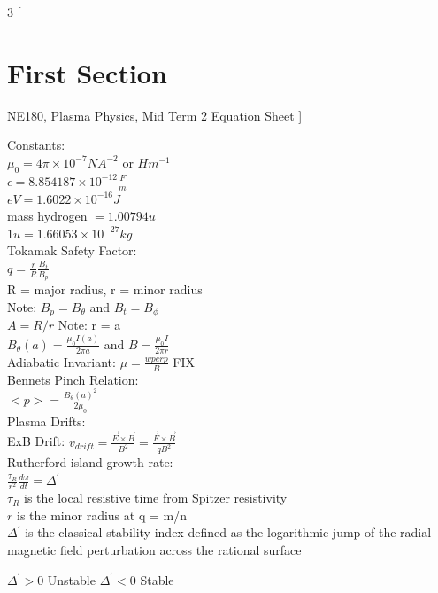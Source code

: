 \documentclass{article}
\begin{document}
\begin{multicols}{3}
[
\section{First Section}
NE180, Plasma Physics, Mid Term 2 Equation Sheet
]

Constants:\\
$\mu_{0} = 4 \pi \times 10 ^{-7} NA^{-2}$ or $Hm^{-1} $\\
$\epsilon = 8.854187 \times 10 ^{-12} \frac{F}{m}$\\	
$eV = 1.6022\times 10 ^{-16} J$\\
mass hydrogen $ = 1.00794u  $\\
$1u = 1.66053 \times 10^{-27} kg $\\

Tokamak Safety Factor:\\
$q = \frac{r}{R}\frac{B_{t}}{B_{p}}$\\
R =  major radius, r = minor radius\\
Note: $B_{p} = B_{\theta}$ and $B_{t} = B_{\phi}$\\
$A = R / r$ Note: r = a\\
$B_{\theta}(a) = \frac{\mu_{0}I(a)}{2 \pi a}$ and $B = \frac{\mu_{0}I}{2\pi r}$\\
Adiabatic Invariant: $\mu = \frac{wperp}{B}$ FIX\\

Bennets Pinch Relation: \\
$<p> = \frac{B_{\theta}(a)^{2}}{2\mu_{0}}$\\

Plasma Drifts:\\
ExB Drift: $v_{drift} = \frac{\vec{E}\times\vec{B}}{B^{2}} = \frac{\vec{F}\times\vec{B}}{qB^{2}}$\\

Rutherford island growth rate:\\
$\frac{\tau_{R}}{r^{2}} \frac{d\omega}{dt} = \Delta ^{\prime}$\\
$\tau_{R}$ is the local resistive time from Spitzer resistivity \\
$r$ is the minor radius at q = m/n\\
$\Delta ^{\prime}$ is the classical stability index defined as the logarithmic jump of the radial magnetic field perturbation across the rational surface

$\Delta ^{\prime} > 0$ Unstable 
$\Delta ^{\prime} < 0$ Stable  


\end{multicols}
\end{document}
